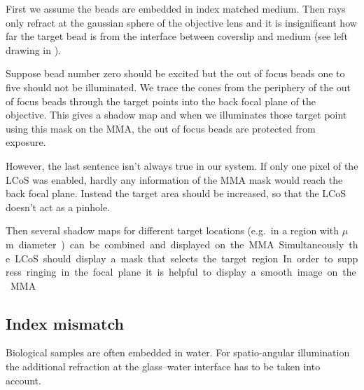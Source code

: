 First we assume the beads are embedded in index matched medium. Then
rays only refract at the gaussian sphere of the objective lens and it
is insignificant how far the target bead is from the interface between
coverslip and medium (see left drawing in
).


Suppose bead number zero should be excited but the out of focus beads
one to five should not be illuminated. We trace the cones from the
periphery of the out of focus beads through the target points into the
back focal plane of the objective. This gives a shadow map and when we
illuminates those target point using this mask on the MMA, the out of
focus beads are protected from exposure.

However, the last sentence isn't always true in our system. If only
one pixel of the LCoS was enabled, hardly any information of the MMA
mask would reach the back focal plane. Instead the target area should
be increased, so that the LCoS doesn't act as a pinhole.

Then several shadow maps for different target locations (e.g.\ in a
region with \unit[3]{$\mu$m} diameter) can be combined and displayed
on the MMA.  Simultaneously the LCoS should display a mask that
selects the target region. In order to suppress ringing in the focal
plane it is helpful to display a smooth image on the MMA.









\subsection{Index mismatch}

Biological samples are often embedded in water. For spatio-angular
illumination the additional refraction at the glass--water interface
has to be taken into account.

